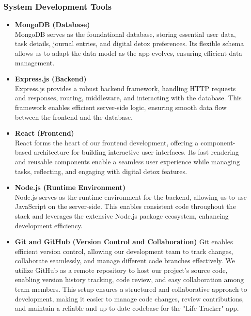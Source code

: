\subsubsection{System Development Tools}
\begin{itemize}
    \item \textbf{MongoDB (Database)}\\
    MongoDB serves as the foundational database, storing essential user data, task details, journal entries, and digital detox preferences. Its flexible schema allows us to adapt the data model as the app evolves, ensuring efficient data management.
 
    \item \textbf{Express.js (Backend)}\\
    Express.js provides a robust backend framework, handling HTTP requests and responses, routing, middleware, and interacting with the database. This framework enables efficient server-side logic, ensuring smooth data flow between the frontend and the database.

    \item \textbf{React (Frontend)}\\
     React forms the heart of our frontend development, offering a component-based architecture for building interactive user interfaces. Its fast rendering and reusable components enable a seamless user experience while managing tasks, reflecting, and engaging with digital detox features.
     
    \item \textbf{Node.js (Runtime Environment)}\\
    Node.js serves as the runtime environment for the backend, allowing us to use JavaScript on the server-side. This enables consistent code throughout the stack and leverages the extensive Node.js package ecosystem, enhancing development efficiency.
    
     \item \textbf{Git and GitHub (Version Control and Collaboration)}
      Git enables efficient version control, allowing our development team to track changes, collaborate seamlessly, and manage different code branches effectively. We utilize GitHub as a remote repository to host our project's source code, enabling version history tracking, code review, and easy collaboration among team members. This setup ensures a structured and collaborative approach to development, making it easier to manage code changes, review contributions, and maintain a reliable and up-to-date codebase for the "Life Tracker" app.
\end{itemize}

